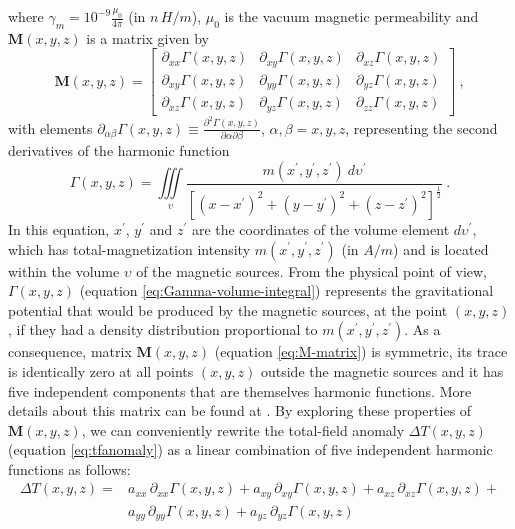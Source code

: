 where $\gamma_{m} = 10^{-9} \frac{\mu_{0}}{4 \pi}$ (in $n \, H / m $), 
$\mu_{0}$ is the vacuum magnetic permeability and $\mathbf{M}(x, y, z)$ is a matrix 
given by
\begin{equation}
	\mathbf{M}(x, y, z) = \begin{bmatrix}
		\partial_{xx} \Gamma(x, y, z) & 
		\partial_{xy} \Gamma(x, y, z) &
		\partial_{xz} \Gamma(x, y, z) \\
		\partial_{xy} \Gamma(x, y, z) & 
		\partial_{yy} \Gamma(x, y, z) &
		\partial_{yz} \Gamma(x, y, z) \\
		\partial_{xz} \Gamma(x, y, z) & 
		\partial_{yz} \Gamma(x, y, z) &
		\partial_{zz} \Gamma(x, y, z)
	\end{bmatrix} \: ,
	\label{eq:M-matrix}
\end{equation}
with elements
$\partial_{\alpha\beta} \Gamma(x, y, z) \equiv 
\frac{\partial^{2} \Gamma(x, y, z)}{\partial \alpha \partial \beta}$, 
$\alpha, \beta = x, y, z$, representing the second derivatives of the harmonic
function
\begin{equation}
\Gamma(x, y, z) = \iiint\limits_{\upsilon} 
\frac{m(x^{\prime}, y^{\prime}, z^{\prime}) \: d\upsilon^{\prime}}
{\left[ (x-x^{\prime})^2 + (y-y^{\prime})^2 + (z-z^{\prime})^2 \right]^{\frac{1}{2}}} \: .
\label{eq:Gamma-volume-integral}
\end{equation}
In this equation, $x^{\prime}$, $y^{\prime}$ and $z^{\prime}$ are the coordinates 
of the volume element $d \upsilon^{\prime}$, which has total-magnetization intensity
$m(x^{\prime}, y^{\prime}, z^{\prime})$ (in $A/m$) and is located within the 
volume $\upsilon$ of the magnetic sources.
From the physical point of view, $\Gamma(x, y, z)$ (equation \ref{eq:Gamma-volume-integral})
represents the gravitational potential that would be produced by the magnetic sources,
at the point $(x, y, z)$, if they had a density distribution proportional to 
$m(x^{\prime}, y^{\prime}, z^{\prime})$.
As a consequence, matrix $\mathbf{M}(x, y, z)$ (equation \ref{eq:M-matrix}) is symmetric,
its trace is identically zero at all points $(x, y, z)$ outside the magnetic sources
and it has five independent components that are themselves harmonic functions. More details
about this matrix can be found at \cite{pedersen_rasmussen1990}.
By exploring these properties of $\mathbf{M}(x, y, z)$, we can conveniently rewrite the 
total-field anomaly $\Delta T(x, y, z)$ (equation \ref{eq:tfanomaly}) as a linear combination 
of five independent harmonic functions as follows:
\begin{equation}
\begin{split}
\Delta T(x, y, z) = 
&a_{xx} \, \partial_{xx} \Gamma(x, y, z) + 
a_{xy} \, \partial_{xy} \Gamma(x, y, z) + 
a_{xz} \, \partial_{xz} \Gamma(x, y, z) + \\
&a_{yy} \, \partial_{yy} \Gamma(x, y, z) + 
a_{yz} \, \partial_{yz} \Gamma(x, y, z)
\end{split}
\label{eq:tfanomaly-alternative}
\end{equation}
